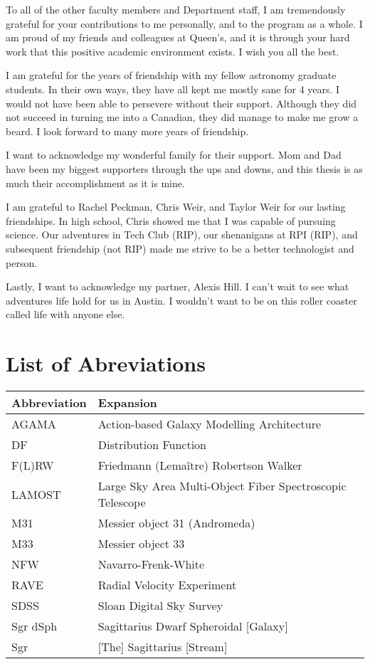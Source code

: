 To all of the other faculty members and Department staff, I am tremendously grateful for your contributions to me personally, and to the program as a whole. I am proud of my friends and colleagues at Queen's, and it is through your hard work that this positive academic environment exists. I wish you all the best.

I am grateful for the years of friendship with my fellow astronomy graduate students. In their own ways, they have all kept me mostly sane for 4 years. I would not have been able to persevere without their support. Although they did not succeed in turning me into a Canadian, they did manage to make me grow a beard. I look forward to many more years of friendship.

I want to acknowledge my wonderful family for their support. Mom and Dad have been my biggest supporters through the ups and downs, and this thesis is as much their accomplishment as it is mine. 

I am grateful to Rachel Peckman, Chris Weir, and Taylor Weir for our lasting friendships. In high school, Chris showed me that I was capable of pursuing science. Our adventures in Tech Club (RIP), our shenanigans at RPI (RIP), and subsequent friendship (not RIP) made me strive to be a better technologist and person.

Lastly, I want to acknowledge my partner, Alexis Hill. I can't wait to see what adventures life hold for us in Austin. I wouldn't want to be on this roller coaster called life with anyone else.



\singlespacing \afterpreface \doublespacing

\chapter*{List of Abreviations}
\begin{longtable}{ll} 
\hline
Abbreviation & Expansion \\ \hline
\textsc{AGAMA} & Action-based Galaxy Modelling Architecture \\
DF & Distribution Function \\
F(L)RW & Friedmann (Lema\^itre) Robertson Walker\\
LAMOST & Large Sky Area Multi-Object Fiber Spectroscopic Telescope \\
M31 & Messier object 31 (Andromeda) \\
M33 & Messier object 33\\
NFW & Navarro-Frenk-White\\
RAVE & Radial Velocity Experiment \\
SDSS & Sloan Digital Sky Survey\\
Sgr dSph & Sagittarius Dwarf Spheroidal [Galaxy]\\
Sgr  & [The] Sagittarius [Stream]\\ \hline
\end{longtable}

